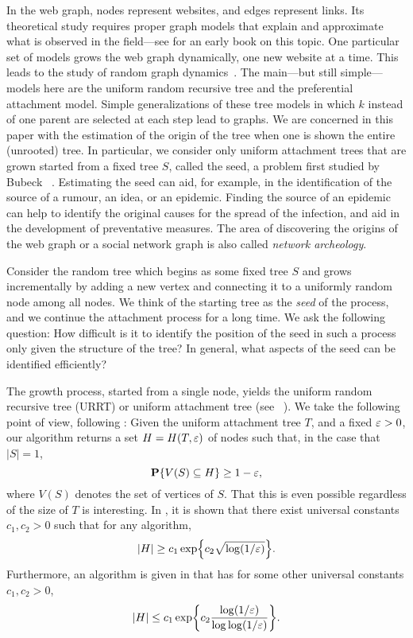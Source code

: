 In the web graph, nodes represent websites, and edges represent
links. Its theoretical study requires proper graph models that explain
and approximate what is observed in the field---see \cite{bonato} for
an early book on this topic. One particular set of models grows the
web graph dynamically, one new website at a time. This leads to the
study of random graph dynamics~\cite{durrett, remco}. The main---but
still simple---models here are the uniform random recursive tree and
the preferential attachment model. Simple generalizations of these
tree models in which $k$ instead of one parent are selected at each
step lead to graphs. We are concerned in this paper with the
estimation of the origin of the tree when one is shown the entire
(unrooted) tree. In particular, we consider only uniform attachment
trees that are grown started from a fixed tree $S$, called the seed, a
problem first studied by Bubeck \etal~\cite{seed-influence,
  bubeck-influence1}. Estimating the seed can aid, for example, in the
identification of the source of a rumour, an idea, or an
epidemic. Finding the source of an epidemic can help to identify the
original causes for the spread of the infection, and aid in the
development of preventative measures. The area of discovering the
origins of the web graph or a social network graph is also called
\emph{network archeology}.

Consider the random tree which begins as some fixed tree $S$ and grows
incrementally by adding a new vertex and connecting it to a uniformly
random node among all nodes. We think of the starting tree as the
\emph{seed} of the process, and we continue the attachment process for
a long time. We ask the following question: How difficult is it to
identify the position of the seed in such a process only given the
structure of the tree? In general, what aspects of the seed can be
identified efficiently?

The growth process, started from a single node, yields the uniform
random recursive tree (URRT) or uniform attachment tree (see
\eg~\cite{devroye-records, drmota, moon, na-rapoport}). We take the
following point of view, following \cite{finding-adam}: Given the
uniform attachment tree $T$, and a fixed $\varepsilon > 0$, our algorithm
returns a set $H = H(T, \varepsilon)$ of nodes such that, in the case that
$|S| = 1$,
\[
  \operatorname{\mathbf{P}}\{V(S) \subseteq H\} \ge 1 - \varepsilon ,
\]
where $V(S)$ denotes the set of vertices of $S$. That this is even
possible regardless of the size of $T$ is interesting. In
\cite{finding-adam}, it is shown that there exist universal constants
$c_1, c_2 > 0$ such that for any algorithm,
\[
  |H| \ge c_1 \exp \left\{ c_2 \sqrt{\log (1/\eps) } \right\} .
\]
Furthermore, an algorithm is given in \cite{finding-adam} that has for
some other universal constants $c_1, c_2 > 0$,
\[
  |H| \le c_1 \exp \left\{ c_2 \frac{ \log (1/\eps) }{\log \log (1/\eps) } \right\} .
\]

